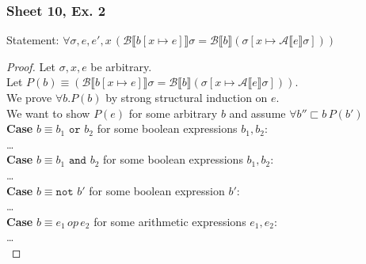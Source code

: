 \documentclass[12pt]{article}
\def\A{\mathcal{A}}
\def\B{\mathcal{B}}
\def\nott{\texttt{not }}
\def\andt{\texttt{ and }}
\def\ort{\texttt{ or }}
\def\llb{\llbracket}
\def\rrb{\rrbracket}
\begin{document}
\subsubsection{Sheet 10, Ex. 2}
Statement: $ \forall \sigma, e, e', x \, (\B \llb b [x \mapsto e]\rrb \sigma = \B \llb b\rrb (\sigma[x \mapsto \A \llb e \rrb \sigma]))$
\begin{proof}
    Let $\sigma, x, e$ be arbitrary. \\
    Let $P(b) \equiv (\B \llb b [x \mapsto e]\rrb \sigma = \B \llb b\rrb (\sigma[x \mapsto \A \llb e \rrb \sigma]))$.\\
    We prove $\forall b. P(b)$ by strong structural induction on $e$. \\
    We want to show $P(e)$ for some arbitrary $b$ and assume $\forall b''  \sqsubset b \, P(b')$ \\
    \textbf{Case} $b \equiv b_1 \ort b_2$ for some boolean expressions $b_1,b_2$:\\
    \dots \\
    \textbf{Case} $b \equiv b_1 \andt b_2$ for some boolean expressions $b_1,b_2$:\\
    \dots \\
    \textbf{Case} $b \equiv \nott b'$ for some boolean expression $b'$:\\
    \dots \\
    \textbf{Case} $b \equiv e_1 \, op \, e_2$ for some arithmetic expressions $e_1, e_2$:\\
    \dots \\
\end{proof}
\end{document}
